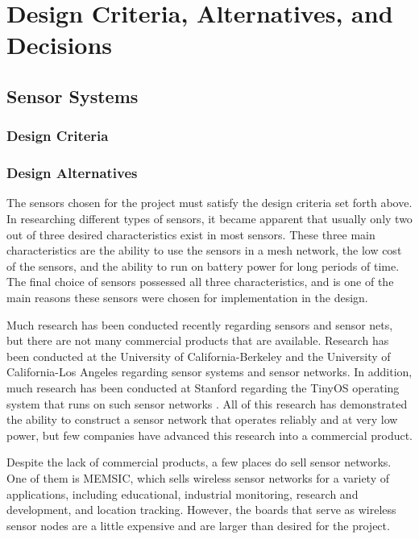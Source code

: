 \documentclass[ppfs.tex]{template/subfiles}
\begin{document}
\section{Design Criteria, Alternatives, and Decisions}

\subsection{Sensor Systems}

\subsubsection{Design Criteria}

\subsubsection{Design Alternatives}

The sensors chosen for the project must satisfy the design criteria set forth above. In researching different types of sensors, it became apparent that usually only two out of three desired characteristics exist in most sensors. These three main characteristics are the ability to use the sensors in a mesh network, the low cost of the sensors, and the ability to run on battery power for long periods of time. The final choice of sensors possessed all three characteristics, and is one of the main reasons these sensors were chosen for implementation in the design.

Much research has been conducted recently regarding sensors and sensor nets, but there are not many commercial products that are available. Research has been conducted at the University of California-Berkeley \cite{1, 2} and the University of California-Los Angeles \cite{3} regarding sensor systems and sensor networks. In addition, much research has been conducted at Stanford regarding the TinyOS operating system that runs on such sensor networks \cite{4}. All of this research has demonstrated the ability to construct a sensor network that operates reliably and at very low power, but few companies have advanced this research into a commercial product.

Despite the lack of commercial products, a few places do sell sensor networks. One of them is MEMSIC, which sells wireless sensor networks for a variety of applications, including educational, industrial monitoring, research and development, and location tracking. However, the boards that serve as wireless sensor nodes are a little expensive and are larger than desired for the project. \cite{5}
\end{document}
